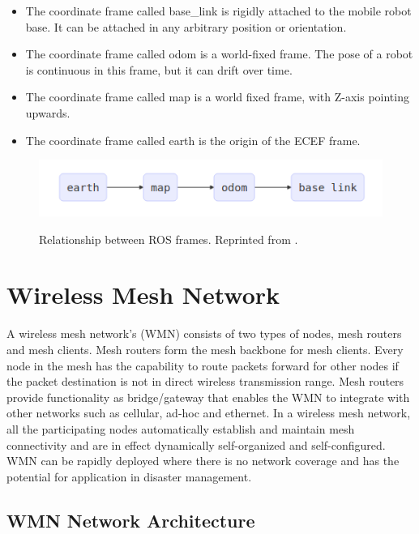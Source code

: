 \begin{itemize}
	\item The coordinate frame called base\_link is rigidly attached to the mobile robot base. It can be attached in any arbitrary position or orientation.
	\item The coordinate frame called odom is a world-fixed frame. The pose of a robot is continuous in this frame, but it can drift over time.
	\item The coordinate frame called map is a world fixed frame, with Z-axis pointing upwards. 
	\item The coordinate frame called earth is the origin of the ECEF frame.
\end{itemize}

\begin{figure}
	\centering
	\caption[Relation between ROS frames]{\small 
		Relationship between ROS frames. Reprinted from . }
	\includegraphics[width=5in]{figures/literature/ros_rel_frames}
	\label{fig:rosrefframes}
\end{figure}

\section{Wireless Mesh Network}

A wireless mesh network's (WMN) consists of two types of nodes, mesh routers and mesh clients. Mesh routers form the mesh backbone for mesh clients. Every node in the mesh has the capability to route packets forward for other nodes if the packet destination is not in direct wireless transmission range. Mesh routers provide functionality as bridge/gateway that enables the WMN to integrate with other networks such as cellular, ad-hoc and ethernet. In a wireless mesh network, all the participating nodes automatically establish and maintain mesh connectivity and are in effect dynamically self-organized and self-configured. WMN can be rapidly deployed where there is no network coverage and has the potential for application in disaster management.

\subsection{WMN Network Architecture}

